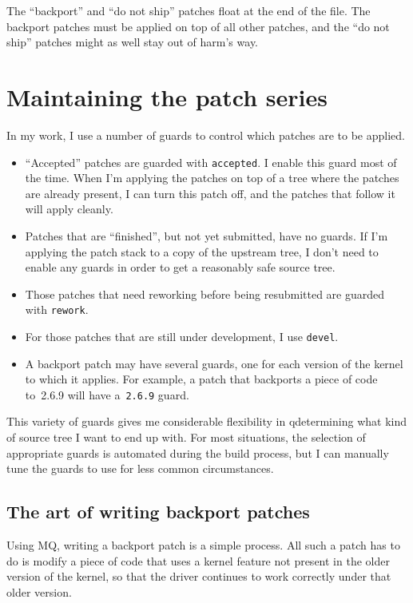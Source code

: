 The ``backport'' and ``do not ship'' patches float at the end of the
 file.  The backport patches must be applied on top
of all other patches, and the ``do not ship'' patches might as well
stay out of harm's way.

\section{Maintaining the patch series}

In my work, I use a number of guards to control which patches are to
be applied.

\begin{itemize}
\item ``Accepted'' patches are guarded with \texttt{accepted}.  I
  enable this guard most of the time.  When I'm applying the patches
  on top of a tree where the patches are already present, I can turn
  this patch off, and the patches that follow it will apply cleanly.
\item Patches that are ``finished'', but not yet submitted, have no
  guards.  If I'm applying the patch stack to a copy of the upstream
  tree, I don't need to enable any guards in order to get a reasonably
  safe source tree.
\item Those patches that need reworking before being resubmitted are
  guarded with \texttt{rework}.
\item For those patches that are still under development, I use
  \texttt{devel}.
\item A backport patch may have several guards, one for each version
  of the kernel to which it applies.  For example, a patch that
  backports a piece of code to~2.6.9 will have a~\texttt{2.6.9} guard.
\end{itemize}
This variety of guards gives me considerable flexibility in
qdetermining what kind of source tree I want to end up with.  For most
situations, the selection of appropriate guards is automated during
the build process, but I can manually tune the guards to use for less
common circumstances.

\subsection{The art of writing backport patches}

Using MQ, writing a backport patch is a simple process.  All such a
patch has to do is modify a piece of code that uses a kernel feature
not present in the older version of the kernel, so that the driver
continues to work correctly under that older version.

